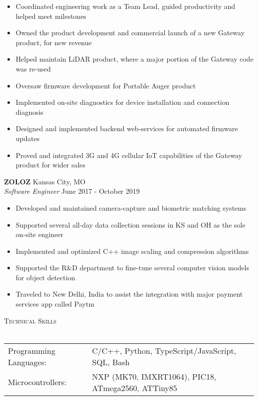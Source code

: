 \documentclass[a4paper]{article}
\newcommand{\lineunder} {
    \vspace*{-8pt} \\
    \hspace*{-18pt} \hrulefill \\
}
\newcommand{\header} [1] {
    {\hspace*{-18pt}\vspace*{6pt} \textsc{#1}}
    \vspace*{-6pt} \lineunder
}
\begin{document}
\begin{itemize} \itemsep 1pt
	\item Coordinated engineering work as a Team Lead, guided productivity and helped meet milestones
	\item Owned the product development and commercial launch of a new Gateway product, for new revenue
	\item Helped maintain LiDAR product, where a major portion of the Gateway code was re-used
	\item Oversaw firmware development for Portable Auger product
	\item Implemented on-site diagnostics for device installation and connection diagnosis
	\item Designed and implemented backend web-services for automated firmware updates
	\item Proved and integrated 3G and 4G cellular IoT capabilities of the Gateway product for wider sales
\end{itemize}
\textbf{ZOLOZ} \hfill Kansas City, MO\\
\textit{Software Engineer} \hfill June 2017 - October 2019\\
\vspace{-1mm}
\begin{itemize} \itemsep 1pt
	\item Developed and maintained camera-capture and biometric matching systems
	\item Supported several all-day data collection sessions in KS and OH as the sole on-site engineer
	\item Implemented and optimized C++ image scaling and compression algorithms
	\item Supported the R\&D department to fine-tune several computer vision models for object detection
	\item Traveled to New Delhi, India to assist the integration with major payment services app called Paytm
\end{itemize}

\header{Technical Skills}
\vspace{2mm}
\begin{tabular}{ l l }
	Programming Languages: & C/C++, Python, TypeScript/JavaScript, SQL, Bash                            \\
    Microcontrollers:      & NXP (MK70, IMXRT1064), PIC18, ATmega2560, ATTiny85        \\
\end{tabular}
\vspace{5mm}
\end{document}
